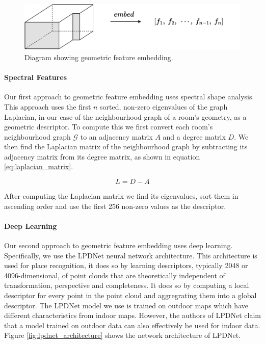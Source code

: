 \begin{figure}[h]
    \centering
    \includegraphics*[width=.8\textwidth]{./fig/embed_geometry.pdf}
    \caption{Diagram showing geometric feature embedding.}
    \label{fig:geometric_embedding}
\end{figure}

\paragraph{Spectral Features}
Our first approach to geometric feature embedding uses spectral shape analysis. This approach uses the first \(n\) sorted, non-zero eigenvalues of the graph Laplacian, in our case of the neighbourhood graph of a room's geometry, as a geometric descriptor. To compute this we first convert each room's neighbourhood graph \(\mathcal{G}\) to an adjacency matrix \(A\) and a degree matrix \(D\). We then find the Laplacian matrix of the neighbourhood graph by subtracting its adjacency matrix from its degree matrix, as shown in equation \ref{eq:laplacian_matrix}.

\begin{equation}
    \label{eq:laplacian_matrix}
L = D - A
\end{equation}

After computing the Laplacian matrix we find its eigenvalues, sort them in ascending order and use the first 256 non-zero values as the descriptor. 


\paragraph{Deep Learning}
Our second approach to geometric feature embedding uses deep learning. Specifically, we use the LPDNet neural network architecture. This architecture is used for place recognition, it does so by learning descriptors, typically 2048 or 4096-dimensional, of point clouds that are theoretically independent of transformation, perspective and completeness. It does so by computing a local descriptor for every point in the point cloud and aggregrating them into a global descriptor. The LPDNet model we use is trained on outdoor maps which have different characteristics from indoor maps. However, the authors of LPDNet claim that a model trained on outdoor data can also effectively be used for indoor data. Figure \ref{fig:lpdnet_architecture} shows the network architecture of LPDNet.


